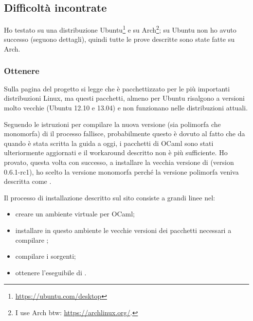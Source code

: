 \subsection{Difficoltà incontrate}
Ho testato \cduce su una distribuzione Ubuntu\footnote{\url{https://ubuntu.com/desktop}} e su Arch\footnote{I use Arch btw: \url{https://archlinux.org/}.}; su Ubuntu non ho avuto successo (seguono dettagli), quindi tutte le prove descritte sono state fatte su Arch.
\subsubsection{Ottenere \cduce}\label{cduce_install}
Sulla pagina del progetto si legge che \cduce è pacchettizzato per le più importanti distribuzioni Linux, ma questi pacchetti, almeno per Ubuntu risalgono a versioni molto vecchie (Ubuntu 12.10 e 13.04) e non funzionano nelle distribuzioni attuali.

Seguendo le istruzioni per compilare la nuova versione (sia polimorfa che monomorfa) di \cduce il processo fallisce, probabilmente questo è dovuto al fatto che da quando è stata scritta la guida a oggi, i pacchetti di OCaml sono stati ulteriormente aggiornati e il workaround descritto non è più sufficiente. Ho provato, questa volta con successo, a installare la vecchia versione di \cduce (version 0.6.1-rc1), ho scelto la versione monomorfa perché la versione polimorfa veniva descritta come .

Il processo di installazione descritto sul sito consiste a grandi linee nel:
\begin{itemize}
	\item creare un ambiente virtuale per OCaml;
	\item installare in questo ambiente le vecchie versioni dei pacchetti necessari a compilare \cduce;
	\item compilare i sorgenti;
	\item ottenere l'eseguibile di \cduce.
\end{itemize}
